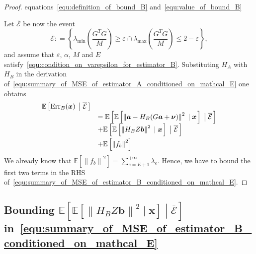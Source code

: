 \documentclass[10pt,twocolumn,twoside]{IEEEtran}					%
\theoremstyle	{plain}
\newcommand{\DefinedAs}			[0]	{\mathrel{\mathop:}=}
\newcommand{\Expectation}					[0]	{\mathbb{E}}
\newcommand{\ExpectationOf}					[1]	{\Expectation \left[ #1 \right]}
\newcommand{\ExpectationOfGiven}			[2]	{\ExpectationOf{ #1 \; \left| \; #2 \right. }}
\begin{document}
\begin{proof}{equations~\eqref{equ:definition_of_bound_B} and~\eqref{equ:value_of_bound_B}}

Let $\overline{\mathcal{E}}$ be now the event
%
\begin{equation}
	\overline{\mathcal{E}}
	\DefinedAs
	\left\{
		\lambda_{\textrm{min}} \left( \frac{G^{T} G}{M} \right)
		\geq
		\varepsilon
		\cap
		\lambda_{\textrm{max}} \left( \frac{G^{T} G}{M} \right)
		\leq
		2 - \varepsilon
	\right\} ,
	\label{equ:definition_of_the_event_mathcal_E_for_max}
\end{equation}
%
and assume that $\varepsilon$, $\alpha$, $M$ and $E$ satisfy~\eqref{equ:condition_on_varepsilon_for_estimator_B}. Substituting $H_{A}$ with $H_{B}$ in the derivation of~\eqref{equ:summary_of_MSE_of_estimator_A_conditioned_on_mathcal_E} one obtains
%
\begin{equation}
	\begin{array}{ll}
		\ExpectationOfGiven{\mathrm{Err}_{B}(\bm{x})}{\overline{\mathcal{E}}}  \\
		& = 
		\ExpectationOfGiven{ \ExpectationOfGiven{ \left\| \bm{a} - H_{B} ( G \bm{a} + \bm{\nu} ) \right\|^{2} }{\bm{x}}}{\overline{\mathcal{E}}} \\ & \vspace{0.1cm}
		+ \ExpectationOfGiven{ \ExpectationOfGiven{\left\| H_{B} Z \bm{b} \right\|^{2}}{\bm{x}} }{\overline{\mathcal{E}}}\\ &
		+ \ExpectationOf{ \left\| f_{b} \right\|^{2} }
	\end{array}
	\label{equ:summary_of_MSE_of_estimator_B_conditioned_on_mathcal_E}
\end{equation}
%
We already know that $\ExpectationOf{ \left\| f_{b} \right\|^{2} } = \sum_{e = E + 1}^{+\infty} \lambda_{e} $. Hence, we have to bound the first two terms in the \ac{RHS} of~\eqref{equ:summary_of_MSE_of_estimator_B_conditioned_on_mathcal_E}.

\end{proof}

\subsection*{Bounding $\ExpectationOfGiven{ \ExpectationOfGiven{\left\| H_{B} Z \bm{b} \right\|^{2}}{\bm{x}} }{\overline{\mathcal{E}}}$ in~\eqref{equ:summary_of_MSE_of_estimator_B_conditioned_on_mathcal_E}}
\label{ssec:characterization_of_first_term_of_f_B_conditioned_on_mathcal_E}
\end{document}

